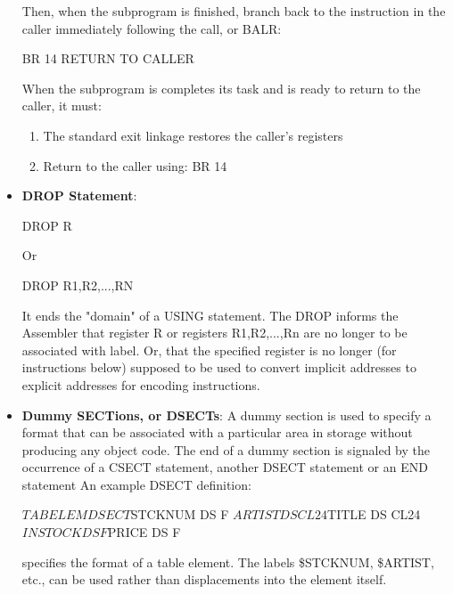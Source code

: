 \documentclass{report}
\begin{document}
\begin{itemize}
            Then, when the subprogram is finished, branch back to the instruction in the caller immediately following the call, or BALR:
            \bigbreak \noindent 
            \begin{cppcode}
            BR 14 RETURN TO CALLER 
            \end{cppcode}
            When the subprogram is completes its task and is ready to return to the caller, it must:
            \begin{enumerate}
                \item The standard exit linkage restores the caller's registers
                \item Return to the caller using: BR 14
            \end{enumerate}
        \item \textbf{DROP Statement}:
            \bigbreak \noindent 
            \begin{cppcode}
            DROP R
            \end{cppcode}
            \bigbreak \noindent 
            Or
            \bigbreak \noindent 
            \begin{cppcode}
            DROP R1,R2,...,RN
            \end{cppcode}
            \bigbreak \noindent 
            It ends the "domain" of a USING statement. The DROP informs the Assembler that register R or registers R1,R2,...,Rn are no longer to be associated with label.
            \bigbreak \noindent 
            Or, that the specified register is no longer (for instructions below) supposed to be used to convert implicit addresses to explicit addresses for encoding instructions.
        \item \textbf{Dummy SECTions, or DSECTs}: A dummy section is used to specify a format that can be associated with a particular area in storage without producing any object code.
            \bigbreak \noindent 
            The end of a dummy section is signaled by the occurrence of a CSECT statement, another DSECT statement or an END statement
            \bigbreak \noindent 
            An example DSECT definition:
            \bigbreak \noindent 
            \begin{cppcode}
                $TABELEM DSECT
                $STCKNUM DS    F
                $ARTIST  DS    CL24
                $TITLE   DS    CL24
                $INSTOCK DS    F
                $PRICE   DS    F
            \end{cppcode}
            \bigbreak \noindent 
            specifies the format of a table element. The labels \$STCKNUM, \$ARTIST, etc., can be used rather than displacements into the element itself.

\end{itemize}
\end{document}
